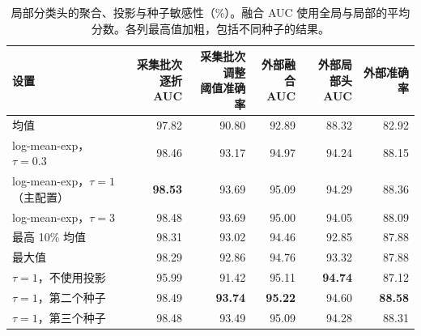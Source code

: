\begin{table}[htbp]
\centering\small
\caption{局部分类头的聚合、投影与种子敏感性（\%）。融合 AUC 使用全局与局部的平均分数。各列最高值加粗，包括不同种子的结果。}
\label{tab:pooling}
\begin{adjustbox}{max width=\linewidth}
\begin{tabular}{lrrrrr}
\toprule
设置 & \makecell{采集批次逐折\\AUC} & \makecell{采集批次调整\\阈值准确率} & \makecell{外部融合\\AUC} & \makecell{外部局部头\\AUC} & 外部准确率\\
\midrule
均值 & 97.82 & 90.80 & 92.89 & 88.32 & 82.92\\
log-mean-exp，$\tau=0.3$ & 98.46 & 93.17 & 94.97 & 94.24 & 88.15\\
log-mean-exp，$\tau=1$（主配置） & \textbf{98.53} & 93.69 & 95.09 & 94.29 & 88.36\\
log-mean-exp，$\tau=3$ & 98.48 & 93.69 & 95.00 & 94.05 & 88.09\\
最高 10\% 均值 & 98.31 & 93.02 & 94.46 & 92.85 & 87.88\\
最大值 & 98.29 & 92.86 & 94.76 & 93.32 & 87.88\\
$\tau=1$，不使用投影 & 95.99 & 91.42 & 95.11 & \textbf{94.74} & 87.12\\
$\tau=1$，第二个种子 & 98.49 & \textbf{93.74} & \textbf{95.22} & 94.60 & \textbf{88.58}\\
$\tau=1$，第三个种子 & 98.48 & 93.49 & 95.09 & 94.28 & 88.31\\
\bottomrule
\end{tabular}
\end{adjustbox}
\end{table}
